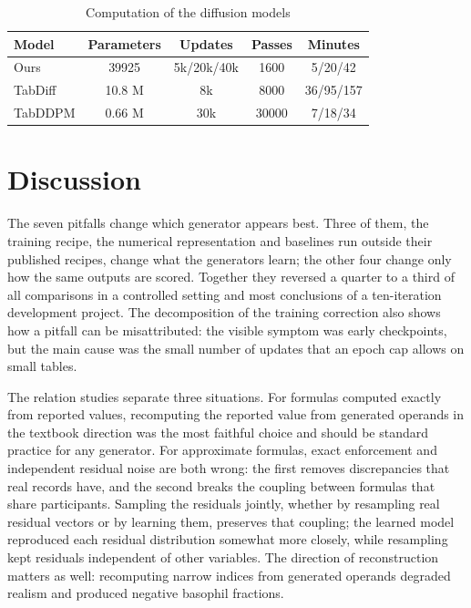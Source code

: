 \documentclass[pdflatex,referee]{sn-jnl}%
\begin{document}
\begin{table}[htbp]
\caption{Computation of the diffusion models}
\label{tab:compute}
\centering
\footnotesize
\setlength{\tabcolsep}{2.5pt}
\begin{tabular}{lcccc}
\toprule
Model & Parameters & Updates & Passes & Minutes \\
\midrule
Ours & 39925 & 5k/20k/40k & 1600 & 5/20/42 \\
TabDiff & 10.8 M & 8k & 8000 & 36/95/157 \\
TabDDPM & 0.66 M & 30k & 30000 & 7/18/34 \\
\bottomrule
\end{tabular}
\end{table}

\section*{Discussion}

The seven pitfalls change which generator appears best. Three of them, the training recipe, the numerical representation and baselines run outside their published recipes, change what the generators learn; the other four change only how the same outputs are scored. Together they reversed a quarter to a third of all comparisons in a controlled setting and most conclusions of a ten-iteration development project. The decomposition of the training correction also shows how a pitfall can be misattributed: the visible symptom was early checkpoints, but the main cause was the small number of updates that an epoch cap allows on small tables.

The relation studies separate three situations. For formulas computed exactly from reported values, recomputing the reported value from generated operands in the textbook direction was the most faithful choice and should be standard practice for any generator. For approximate formulas, exact enforcement and independent residual noise are both wrong: the first removes discrepancies that real records have, and the second breaks the coupling between formulas that share participants. Sampling the residuals jointly, whether by resampling real residual vectors or by learning them, preserves that coupling; the learned model reproduced each residual distribution somewhat more closely, while resampling kept residuals independent of other variables. The direction of reconstruction matters as well: recomputing narrow indices from generated operands degraded realism and produced negative basophil fractions.
\end{document}
